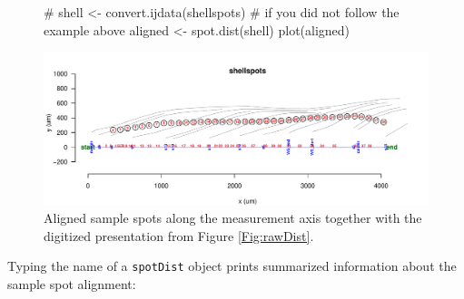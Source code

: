 \documentclass[11pt, a4paper]{article}
\begin{document}
\begin{figure}[H]
\begin{center}
\begin{Schunk}
\begin{Sinput}
 # shell <- convert.ijdata(shellspots) # if you did not follow the example above
 aligned <- spot.dist(shell)
 plot(aligned)
\end{Sinput}
\end{Schunk}
\includegraphics{sclero_tutorial-plot2}
\end{center}
\caption{Aligned sample spots along the measurement axis together with the digitized presentation from Figure \ref{Fig:rawDist}.}
\end{figure}

Typing the name of a \texttt{spotDist} object prints summarized information about the sample spot alignment:
\end{document}
